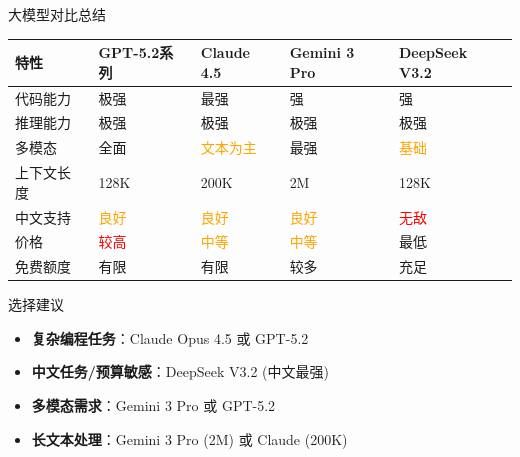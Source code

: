 \documentclass[aspectratio=169,11pt]{beamer}
\begin{document}
\begin{frame}{大模型对比总结}
    \footnotesize
    \begin{tabular}{p{2cm}p{2.5cm}p{2.5cm}p{2.5cm}p{2.5cm}}
        \toprule
        \textbf{特性} & \textbf{GPT-5.2系列} & \textbf{Claude 4.5} & \textbf{Gemini 3 Pro} & \textbf{DeepSeek V3.2} \\
        \midrule
        代码能力 & \textcolor{green!60!black}{极强} & \textcolor{green!60!black}{最强} & \textcolor{green!60!black}{强} & \textcolor{green!60!black}{强} \\
        推理能力 & \textcolor{green!60!black}{极强} & \textcolor{green!60!black}{极强} & \textcolor{green!60!black}{极强} & \textcolor{green!60!black}{极强} \\
        多模态 & \textcolor{green!60!black}{全面} & \textcolor{orange}{文本为主} & \textcolor{green!60!black}{最强} & \textcolor{orange}{基础} \\
        上下文长度 & 128K & 200K & 2M & 128K \\
        中文支持 & \textcolor{orange}{良好} & \textcolor{orange}{良好} & \textcolor{orange}{良好} & \textcolor{red}{无敌} \\
        价格 & \textcolor{red}{较高} & \textcolor{orange}{中等} & \textcolor{orange}{中等} & \textcolor{green!60!black}{最低} \\
        免费额度 & 有限 & 有限 & 较多 & \textcolor{green!60!black}{充足} \\
        \bottomrule
    \end{tabular}
    
    \vspace{0.5cm}
    \begin{block}{选择建议}
        \begin{itemize}
            \item \textbf{复杂编程任务}：Claude Opus 4.5 或 GPT-5.2
            \item \textbf{中文任务/预算敏感}：DeepSeek V3.2 (中文最强)
            \item \textbf{多模态需求}：Gemini 3 Pro 或 GPT-5.2
            \item \textbf{长文本处理}：Gemini 3 Pro (2M) 或 Claude (200K)
        \end{itemize}
    \end{block}
\end{frame}
\end{document}
